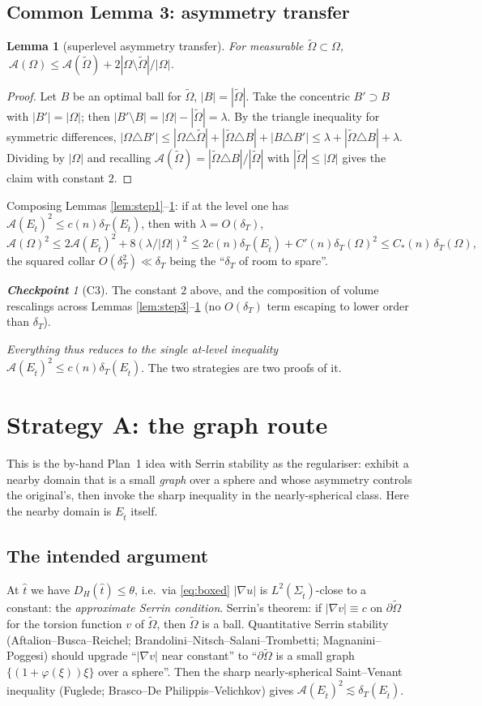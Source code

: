 \documentclass[11pt]{amsart}
\newtheorem{lemma}[theorem]{Lemma}
\theoremstyle{definition}
\theoremstyle{remark}
\newtheorem*{checkpoint}{\textbf{Checkpoint}}
\newcommand{\Om}{\Omega}
\newcommand{\Ot}{\widetilde\Omega}
\newcommand{\Et}{E_{\hat t}}
\newcommand{\St}{\Sigma_{\hat t}}
\newcommand{\dT}{\delta_T}
\newcommand{\Asym}{\mathcal A}
\begin{document}
\subsection{Common Lemma 3: asymmetry transfer}
\begin{lemma}[superlevel asymmetry transfer]\label{lem:step5}
For measurable $\Ot\subset\Om$, $\ \Asym(\Om)\le\Asym(\Ot)+2|\Om\setminus\Ot|/|\Om|$.
\end{lemma}
\begin{proof}
Let $B$ be an optimal ball for $\Ot$, $|B|=|\Ot|$. Take the concentric
$B'\supset B$ with $|B'|=|\Om|$; then $|B'\setminus B|=|\Om|-|\Ot|=\lambda$. By
the triangle inequality for symmetric differences,
$|\Om\triangle B'|\le|\Om\triangle\Ot|+|\Ot\triangle B|+|B\triangle B'|
\le\lambda+|\Ot\triangle B|+\lambda$. Dividing by $|\Om|$ and recalling
$\Asym(\Ot)=|\Ot\triangle B|/|\Ot|$ with $|\Ot|\le|\Om|$ gives the claim with
constant $2$.
\end{proof}
Composing Lemmas \ref{lem:step1}--\ref{lem:step5}: if at the level one has
$\Asym(\Et)^2\le c(n)\dT(\Et)$, then with $\lambda=O(\dT)$,
\[
  \Asym(\Om)^2\le2\Asym(\Et)^2+8(\lambda/|\Om|)^2
  \le2c(n)\dT(\Et)+C'(n)\dT(\Om)^2\le C_*(n)\,\dT(\Om),
\]
the squared collar $O(\dT^2)\ll\dT$ being the ``$\dT$ of room to spare''.
\begin{checkpoint}[C3]
The constant $2$ above, and the composition of volume rescalings across
Lemmas \ref{lem:step3}--\ref{lem:step5} (no $O(\dT)$ term escaping to
lower order than $\dT$).
\end{checkpoint}

\emph{Everything thus reduces to the single at-level inequality}
$\Asym(\Et)^2\le c(n)\dT(\Et)$. The two strategies are two proofs of it.

\section{Strategy A: the graph route}

This is the by-hand Plan~1 idea with Serrin stability as the regulariser:
exhibit a nearby domain that is a small \emph{graph} over a sphere and whose
asymmetry controls the original's, then invoke the sharp inequality in the
nearly-spherical class. Here the nearby domain is $\Et$ itself.

\subsection{The intended argument}
At $\hat t$ we have $D_H(\hat t)\le\theta$, i.e.\ via \eqref{eq:boxed}
$|\nabla u|$ is $L^2(\St)$-close to a constant: the \emph{approximate Serrin
condition}. Serrin's theorem: if $|\nabla v|\equiv c$ on $\partial\Ot$ for the
torsion function $v$ of $\Ot$, then $\Ot$ is a ball. Quantitative Serrin
stability (Aftalion--Busca--Reichel; Brandolini--Nitsch--Salani--Trombetti;
Magnanini--Poggesi) should upgrade ``$|\nabla v|$ near constant'' to
``$\partial\Ot$ is a small graph $\{(1+\varphi(\xi))\xi\}$ over a sphere''.
Then the sharp nearly-spherical Saint--Venant inequality (Fuglede; Brasco--De
Philippis--Velichkov) gives $\Asym(\Et)^2\lesssim\dT(\Et)$.
\end{document}
